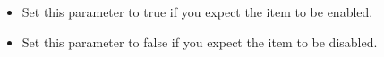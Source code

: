 
\begin{itemize}
\item Set this parameter to true if you expect the item to be enabled.
\item Set this parameter to false if you expect the item to be disabled.
\end{itemize}
